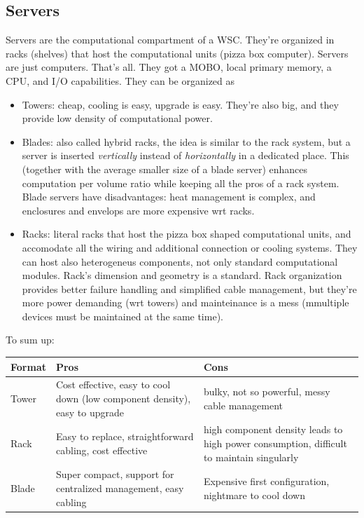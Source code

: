 \documentclass{article}
\begin{document}
			\subsection{Servers}
				Servers are the computational compartment of a WSC. They're organized in racks (shelves) that host the computational units (pizza box computer). Servers are just computers. That's all. They got a MOBO, local primary memory, a CPU, and I/O capabilities. They can be organized as
				\begin{itemize}
					\item Towers: cheap, cooling is easy, upgrade is easy. They're also big, and they provide low density of computational power.
					\item Blades: also called hybrid racks, the idea is similar to the rack system, but a server is inserted \emph{vertically} instead of \emph{horizontally} in a dedicated place. This (together with the average smaller size of a blade server) enhances computation per volume ratio while keeping all the pros of a rack system. Blade servers have disadvantages: heat management is complex, and enclosures and envelops are more expensive wrt racks.
					\item Racks: literal racks that host the pizza box shaped computational units, and accomodate all the wiring and additional connection or cooling systems. They can host also heterogeneus components, not only standard computational modules. Rack's dimension and geometry is a standard. Rack organization provides better failure handling and simplified cable management, but they're more power demanding (wrt towers) and mainteinance is a mess (mmultiple devices must be maintained at the same time).
				\end{itemize}
				To sum up:
				\begin{center}
					\begin{tabular}{ | m{2cm} || m{5cm} | m{5cm} |}
					\hline
					\textbf{Format} & \textbf{Pros} & \textbf{Cons} \\
					\hline
					\hline
					Tower & Cost effective, easy to cool down (low component density), easy to upgrade & bulky, not so powerful, messy cable management \\
					\hline
					Rack & Easy to replace, straightforward cabling, cost effective & high component density leads to high power consumption, difficult to maintain singularly \\
					\hline
					Blade & Super compact, support for centralized management, easy cabling & Expensive first configuration, nightmare to cool down \\
					\hline
					\end{tabular}
				\end{center}
				
\end{document}
